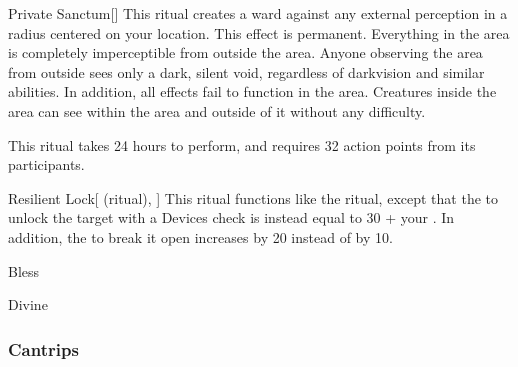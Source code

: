 \lowercase{\hypertarget{spell:Private Sanctum}{}}\label{spell:Private Sanctum}
\begin{apability}[Rank 5]{\hypertarget{spell:Private Sanctum}{Private Sanctum}}[]
\targetrule
This ritual creates a ward against any external perception in a \arealarge radius  centered on your location.
This effect is permanent.
Everything in the area is completely imperceptible from outside the area.
Anyone observing the area from outside sees only a dark, silent void, regardless of darkvision and similar abilities.
In addition, all  effects fail to function in the area.
Creatures inside the area can see within the area and outside of it without any difficulty.

This ritual takes 24 hours to perform, and requires 32 action points from its participants.
\end{apability}
\vspace{0.25em}



\lowercase{\hypertarget{spell:Resilient Lock}{}}\label{spell:Resilient Lock}
\begin{attuneability}[Rank 5]{\hypertarget{spell:Resilient Lock}{Resilient Lock}}[ (ritual), ]
This ritual functions like the  ritual, except that the  to unlock the target with a Devices check is instead equal to 30 + your .
In addition, the  to break it open increases by 20 instead of by 10.
\end{attuneability}
\vspace{0.25em}


\newpage
\begin{spellsection}{Bless}

\begin{spellheader}
\end{spellheader}


 Divine

\subsubsection{Cantrips}


\end{spellsection}


